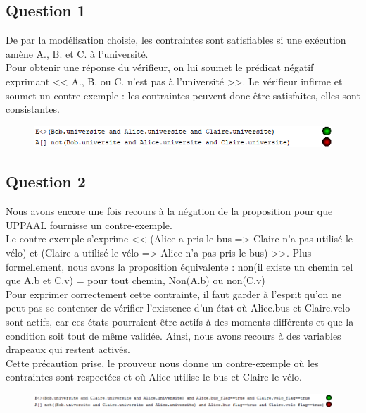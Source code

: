 \documentclass[11pt, a4paper]{article} %
\begin{document}
\subsection{Question 1}
\label{sub:UPPAALQ1}
De par la modélisation choisie, les contraintes sont satisfiables si une exécution amène A., B. et C. à l'université.\\
Pour obtenir une réponse du vérifieur, on lui soumet le prédicat négatif exprimant << A., B. ou C. n'est pas à l'université >>. Le vérifieur infirme et soumet un contre-exemple : les contraintes peuvent donc être satisfaites, elles sont consistantes.

\begin{figure}[h]
    \begin{flushleft}
      \includegraphics[scale=0.60]{captures/uppaalQ1.png}
    \end{flushleft}
\end{figure}


\subsection{Question 2}
\label{sub:UPPAALQ2}
Nous avons encore une fois recours à la négation de la proposition pour que UPPAAL fournisse un contre-exemple.\\
Le contre-exemple s'exprime << (Alice a pris le bus => Claire n'a pas utilisé le vélo) et (Claire a utilisé le vélo => Alice n'a pas pris le bus) >>. Plus formellement, nous avons la proposition équivalente : non(il existe un chemin tel que A.b et C.v) = pour tout chemin, Non(A.b) ou non(C.v)\\
Pour exprimer correctement cette contrainte, il faut garder à l'esprit qu'on ne peut pas se contenter de vérifier l'existence d'un état où Alice.bus et Claire.velo sont actifs, car ces états pourraient être actifs à des moments différents et que la condition soit tout de même validée. Ainsi, nous avons recours à des variables drapeaux qui restent activés.\\
Cette précaution prise, le prouveur nous donne un contre-exemple où les contraintes sont respectées et où Alice utilise le bus et Claire le vélo.

\begin{figure}[h]
    \begin{flushleft}
      \includegraphics[scale=0.60]{captures/uppaalQ2.png}
    \end{flushleft}
\end{figure}
\end{document}
